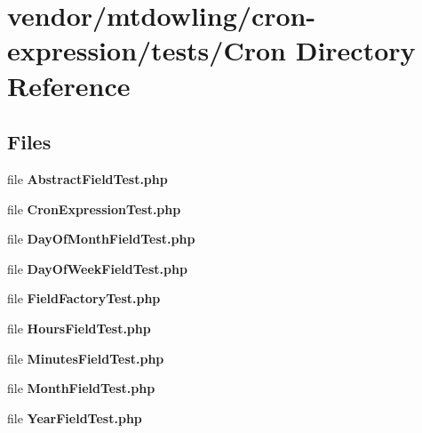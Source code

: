 \section{vendor/mtdowling/cron-\/expression/tests/\+Cron Directory Reference}
\label{dir_69af1346379049dc8951550cba4a2afa}
\subsection*{Files}
\begin{DoxyCompactItemize}
\item 
file {\bf Abstract\+Field\+Test.\+php}
\item 
file {\bf Cron\+Expression\+Test.\+php}
\item 
file {\bf Day\+Of\+Month\+Field\+Test.\+php}
\item 
file {\bf Day\+Of\+Week\+Field\+Test.\+php}
\item 
file {\bf Field\+Factory\+Test.\+php}
\item 
file {\bf Hours\+Field\+Test.\+php}
\item 
file {\bf Minutes\+Field\+Test.\+php}
\item 
file {\bf Month\+Field\+Test.\+php}
\item 
file {\bf Year\+Field\+Test.\+php}
\end{DoxyCompactItemize}
